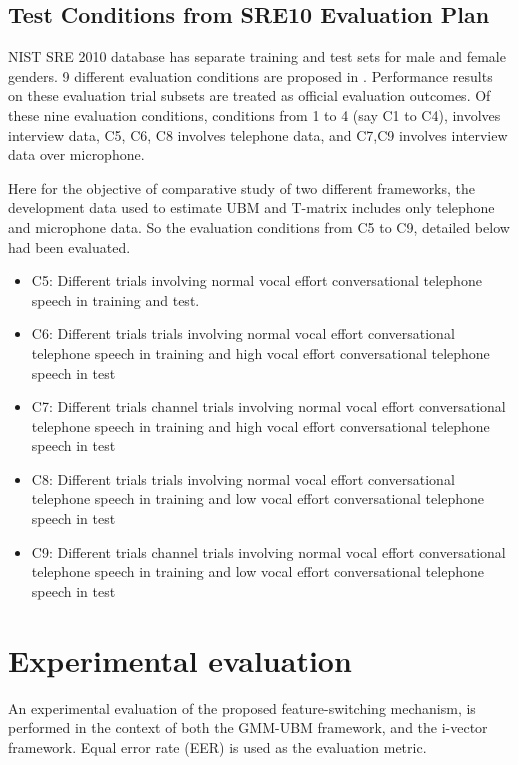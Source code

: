 \documentclass{article}
\begin{document}
\subsection{ \small \bf Test Conditions from SRE10 Evaluation Plan}
\label{subsec:test_conditions}
NIST SRE 2010 database has separate training  and test sets for male and female genders. 9 different evaluation conditions are proposed in  \cite{sre2010}. Performance results on these evaluation trial subsets are treated as official evaluation outcomes. Of these nine evaluation conditions, conditions from 1 to 4  (say C1 to C4), involves interview data, C5, C6, C8 involves telephone data, and C7,C9 involves interview data over microphone.


Here for the objective of comparative study of two different frameworks, the development data used to estimate UBM and T-matrix includes only telephone and microphone data. So the evaluation conditions from C5 to C9, detailed below had been evaluated.

\begin{itemize}
\item C5: Different trials involving normal vocal effort conversational telephone speech in training   and test.
\item C6: Different trials trials involving normal vocal effort conversational telephone speech in training   and high vocal effort conversational telephone speech in test
\item C7: Different trials channel trials involving normal vocal effort conversational telephone speech in training   and high vocal effort conversational telephone speech in test
\item C8: Different trials trials involving normal vocal effort conversational telephone speech in training   and low vocal effort conversational telephone speech in test
\item C9: Different trials channel trials involving normal vocal effort conversational  telephone speech in training   and low vocal effort conversational telephone speech in test
\end{itemize}

\section{Experimental evaluation}
\label{sec:ExpSetup}
An experimental evaluation of the proposed feature-switching
mechanism, is performed in the context of both the GMM-UBM framework, and the i-vector
framework. Equal error rate (EER) is used as the evaluation metric.
\end{document}
